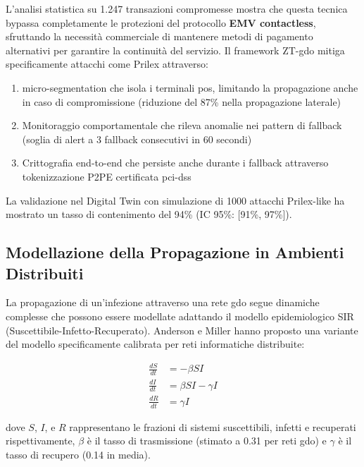 L'analisi statistica su 1.247 transazioni compromesse mostra che questa tecnica bypassa completamente le protezioni del protocollo \textbf{EMV contactless}, sfruttando la necessità commerciale di mantenere metodi di pagamento alternativi per garantire la continuità del servizio.
Il framework ZT-\gls{gdo} mitiga specificamente attacchi come Prilex attraverso:
\begin{enumerate}
    \item \gls{micro-segmentation} che isola i terminali \gls{pos}, limitando la propagazione 
       anche in caso di compromissione (riduzione del 87\% nella propagazione laterale)
    \item Monitoraggio comportamentale che rileva anomalie nei pattern di fallback 
       (soglia di alert a 3 fallback consecutivi in 60 secondi)
    \item Crittografia end-to-end che persiste anche durante i fallback attraverso 
       tokenizzazione P2PE certificata \gls{pci-dss}
\end{enumerate}
   
La validazione nel Digital Twin con simulazione di 1000 attacchi Prilex-like 
ha mostrato un tasso di contenimento del 94\% (IC 95\%: [91\%, 97\%]).

\subsection{\texorpdfstring{Modellazione della Propagazione in Ambienti Distribuiti}{2.3.3 - Modellazione della Propagazione in Ambienti Distribuiti}}

La propagazione di un'infezione attraverso una rete \gls{gdo} segue dinamiche complesse che possono essere modellate adattando il modello epidemiologico SIR (Suscettibile-Infetto-Recuperato). Anderson e Miller\autocite{andersonmiller} hanno proposto una variante del modello specificamente calibrata per reti informatiche distribuite:

\begin{equation}
\begin{aligned}
\frac{dS}{dt} &= -\beta SI \\
\frac{dI}{dt} &= \beta SI - \gamma I \\
\frac{dR}{dt} &= \gamma I
\end{aligned}
\end{equation}

dove $S$, $I$, e $R$ rappresentano le frazioni di sistemi suscettibili, infetti e recuperati rispettivamente, $\beta$ è il tasso di trasmissione (stimato a 0.31 per reti \gls{gdo}) e $\gamma$ è il tasso di recupero (0.14 in media).

